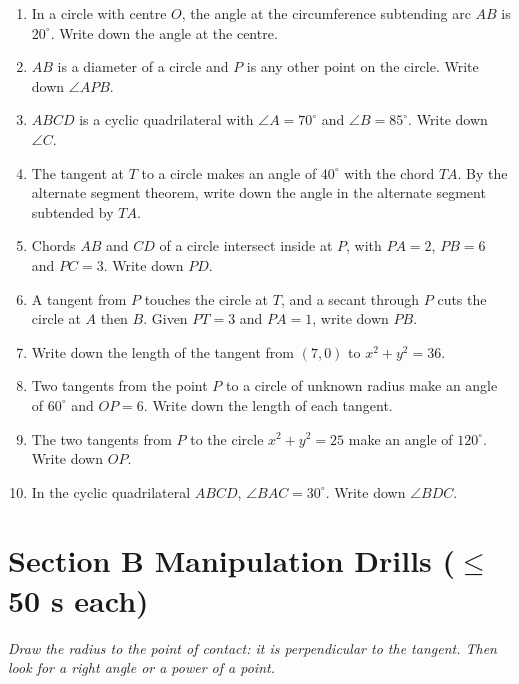 \documentclass[11pt,a4paper]{article}
\begin{document}
\begin{enumerate}

\item In a circle with centre $O$, the angle at the circumference subtending arc $AB$ is $20^\circ$. Write down the angle at the centre.

\item $AB$ is a diameter of a circle and $P$ is any other point on the circle. Write down $\angle APB$.

\item $ABCD$ is a cyclic quadrilateral with $\angle A=70^\circ$ and $\angle B=85^\circ$. Write down $\angle C$.

\item The tangent at $T$ to a circle makes an angle of $40^\circ$ with the chord $TA$. By the alternate segment theorem, write down the angle in the alternate segment subtended by $TA$.

\item Chords $AB$ and $CD$ of a circle intersect inside at $P$, with $PA=2$, $PB=6$ and $PC=3$. Write down $PD$.

\item A tangent from $P$ touches the circle at $T$, and a secant through $P$ cuts the circle at $A$ then $B$. Given $PT=3$ and $PA=1$, write down $PB$.

\item Write down the length of the tangent from $(7,0)$ to $x^2+y^2=36$.

\item Two tangents from the point $P$ to a circle of unknown radius make an angle of $60^\circ$ and $OP=6$. Write down the length of each tangent.

\item The two tangents from $P$ to the circle $x^2+y^2=25$ make an angle of $120^\circ$. Write down $OP$.

\item In the cyclic quadrilateral $ABCD$, $\angle BAC=30^\circ$. Write down $\angle BDC$.

\end{enumerate}

\section*{Section B \quad Manipulation Drills \hfill{\normalfont\small($\leq$50 s each)}}

\noindent\textit{Draw the radius to the point of contact: it is perpendicular to the tangent. Then look for a right angle or a power of a point.}
\end{document}
